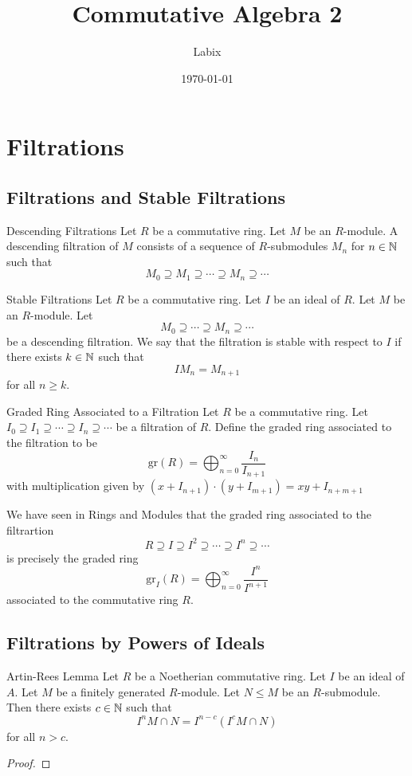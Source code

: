 \documentclass[a4paper]{article}
\title{Commutative Algebra 2}
\author{Labix}
\date{\today}
\begin{document}
\maketitle
\begin{abstract}
\end{abstract}
\pagebreak
\tableofcontents

\pagebreak
\section{Filtrations}
\subsection{Filtrations and Stable Filtrations}
\begin{defn}{Descending Filtrations}{} Let $R$ be a commutative ring. Let $M$ be an $R$-module. A descending filtration of $M$ consists of a sequence of $R$-submodules $M_n$ for $n\in\mathbb{N}$ such that $$M_0\supseteq M_1\supseteq\cdots\supseteq M_n\supseteq\cdots$$
\end{defn}

\begin{defn}{Stable Filtrations}{} Let $R$ be a commutative ring. Let $I$ be an ideal of $R$. Let $M$ be an $R$-module. Let $$M_0\supseteq\cdots\supseteq M_n\supseteq\cdots$$ be a descending filtration. We say that the filtration is stable with respect to $I$ if there exists $k\in\mathbb{N}$ such that $$IM_n=M_{n+1}$$ for all $n\geq k$. 
\end{defn}

\begin{defn}{Graded Ring Associated to a Filtration}{} Let $R$ be a commutative ring. Let $I_0\supseteq I_1\supseteq\cdots\supseteq I_n\supseteq\cdots$ be a filtration of $R$. Define the graded ring associated to the filtration to be $$\text{gr}(R)=\bigoplus_{n=0}^\infty\frac{I_n}{I_{n+1}}$$ with multiplication given by $(x+I_{n+1})\cdot(y+I_{m+1})=xy+I_{n+m+1}$
\end{defn}

We have seen in Rings and Modules that the graded ring associated to the filtrartion $$R\supseteq I\supseteq I^2\supseteq\cdots\supseteq I^n\supseteq\cdots$$ is precisely the graded ring $$\text{gr}_I(R)=\bigoplus_{n=0}^\infty\frac{I^n}{I^{n+1}}$$ associated to the commutative ring $R$. 

\subsection{Filtrations by Powers of Ideals}
\begin{thm}{Artin-Rees Lemma}{} Let $R$ be a Noetherian commutative ring. Let $I$ be an ideal of $A$. Let $M$ be a finitely generated $R$-module. Let $N\leq M$ be an $R$-submodule. Then there exists $c\in\mathbb{N}$ such that $$I^nM\cap N=I^{n-c}(I^cM\cap N)$$ for all $n>c$. \tcbline
\begin{proof}

\end{proof}
\end{thm}
\end{document}

